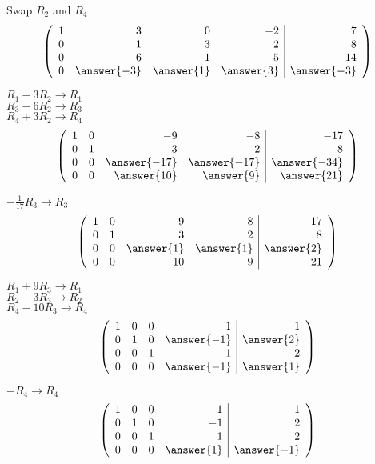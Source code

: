 \documentclass{ximera}
\begin{document}
\begin{exercise}
\begin{prompt}
Swap $R_2$ and $R_4$
\[
\left(\begin{array}{rrrr|r}
     1 &  3 &  0 &  -2 &  7 \\
     0 &  1 &  3 &   2 &  8 \\
     0 &  6 &  1 &  -5 &  14 \\
     0 &  \answer{-3} &  \answer{1} &  \answer{3} & \answer{-3} 
\end{array}\right)
\]

$R_1-3R_2  \rightarrow  R_1$ \\  
$R_3-6R_2  \rightarrow  R_3$ \\
$R_4+3R_2  \rightarrow  R_4$
\[
\left(\begin{array}{rrrr|r}
     1 &  0 &  -9 &  -8 &  -17 \\
     0 &  1 &  3 &   2 &  8 \\
     0 &  0 &  \answer{-17} &  \answer{-17} &  \answer{-34} \\
     0 &  0 &  \answer{10} &  \answer{9} & \answer{21} 
\end{array}\right)
\]

$-\tfrac{1}{17}R_3  \rightarrow R_3$
\[
\left(\begin{array}{rrrr|r}
     1 &  0 &  -9 &  -8 &  -17 \\
     0 &  1 &  3 &   2 &  8 \\
     0 &  0 &  \answer{1} &   \answer{1} &  \answer{2} \\
     0 &  0 &  10 &  9 & 21 
\end{array}\right)
\]

$R_1+9R_3  \rightarrow R_1$  \\  
$R_2-3R_3  \rightarrow R_2$ \\
$R_4-10R_3 \rightarrow R_4$  
\[
\left(\begin{array}{rrrr|r}
     1 &  0 &  0 &   1 &  1 \\
     0 &  1 &  0 &   \answer{-1} &  \answer{2} \\
     0 &  0 &  1 &   1 &  2 \\
     0 &  0 &  0 &   \answer{-1} & \answer{1} 
\end{array}\right)
\]

$-R_4 \rightarrow R_4$
\[
\left(\begin{array}{rrrr|r}
     1 &  0 &  0 &   1 &  1 \\
     0 &  1 &  0 &   -1 &  2 \\
     0 &  0 &  1 &   1 &  2 \\
     0 &  0 &  0 &   \answer{1} & \answer{-1} 
\end{array}\right)
\]


\end{prompt}
\end{exercise}
\end{document}
